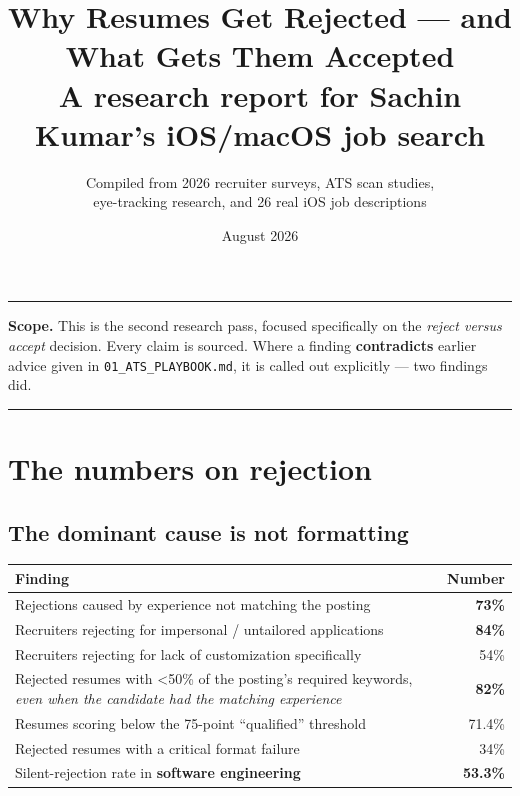 \documentclass[11pt,a4paper]{article}
\title{\textbf{Why Resumes Get Rejected --- and What Gets Them Accepted}\\[4pt]
\large A research report for Sachin Kumar's iOS/macOS job search}
\author{Compiled from 2026 recruiter surveys, ATS scan studies,\\
eye-tracking research, and 26 real iOS job descriptions}
\date{August 2026}
\begin{document}
\maketitle

\noindent\rule{\textwidth}{0.4pt}
\vspace{4pt}

\noindent\textbf{Scope.} This is the second research pass, focused specifically on the
\emph{reject versus accept} decision. Every claim is sourced. Where a finding
\textbf{contradicts} earlier advice given in \texttt{01\_ATS\_PLAYBOOK.md}, it is called out
explicitly --- two findings did.

\vspace{4pt}
\noindent\rule{\textwidth}{0.4pt}

\tableofcontents
\vspace{8pt}

\section{The numbers on rejection}

\subsection{The dominant cause is not formatting}

\begin{center}
\begin{tabular}{p{9.2cm} r}
\hline
\textbf{Finding} & \textbf{Number} \\
\hline
Rejections caused by experience not matching the posting & \textbf{73\%} \\
Recruiters rejecting for impersonal / untailored applications & \textbf{84\%} \\
Recruiters rejecting for lack of customization specifically & 54\% \\
Rejected resumes with \textless 50\% of the posting's required keywords, \emph{even when the candidate had the matching experience} & \textbf{82\%} \\
Resumes scoring below the 75-point ``qualified'' threshold & 71.4\% \\
Rejected resumes with a critical format failure & 34\% \\
Silent-rejection rate in \textbf{software engineering} & \textbf{53.3\%} \\
\hline
\end{tabular}
\end{center}
\end{document}
